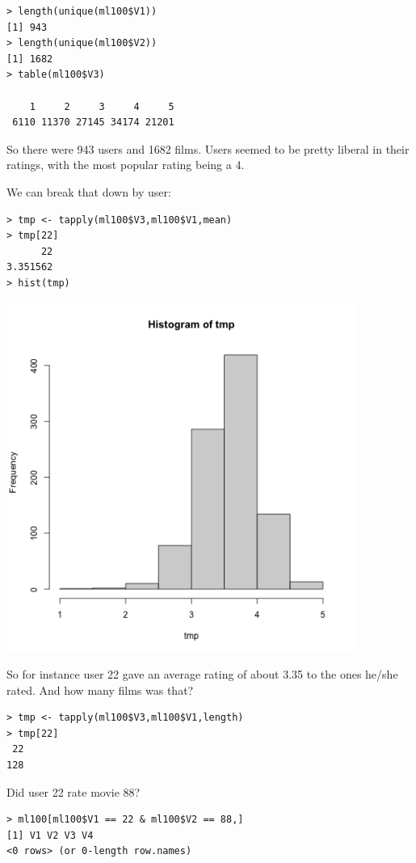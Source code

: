 \begin{lstlisting}
> length(unique(ml100$V1))
[1] 943
> length(unique(ml100$V2))
[1] 1682
> table(ml100$V3)

    1     2     3     4     5 
 6110 11370 27145 34174 21201 
\end{lstlisting}

So there were 943 users and 1682 films.  Users seemed to be pretty
liberal in their ratings, with the most popular rating being a 4.

We can break that down by user:

\begin{lstlisting}
> tmp <- tapply(ml100$V3,ml100$V1,mean)
> tmp[22]
      22 
3.351562 
> hist(tmp)
\end{lstlisting}

\includegraphics[width=4.5in]{Images/Ch1HistMeanRatings.png}

So for instance user 22 gave an average rating of about 3.35 to the ones
he/she rated.  And how many films was that?

\begin{lstlisting}
> tmp <- tapply(ml100$V3,ml100$V1,length)
> tmp[22]
 22 
128 
\end{lstlisting}

Did user 22 rate movie 88?

\begin{lstlisting}
> ml100[ml100$V1 == 22 & ml100$V2 == 88,]
[1] V1 V2 V3 V4
<0 rows> (or 0-length row.names)
\end{lstlisting}

